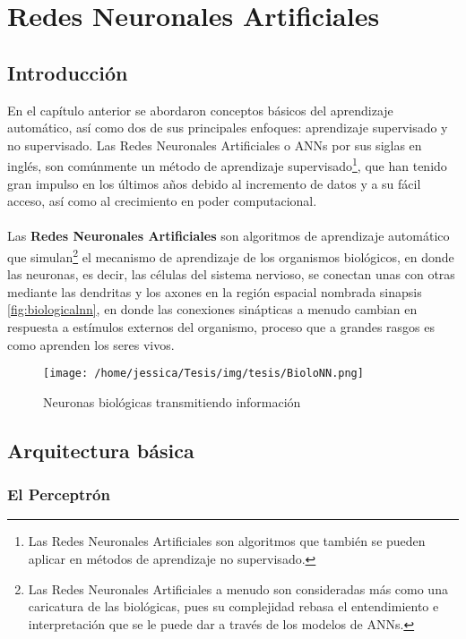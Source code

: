 \chapter{Redes Neuronales Artificiales}\label{ch:NNBasics}
\section{Introducción}

En el capítulo anterior se abordaron conceptos básicos del aprendizaje automático, así como dos de sus principales enfoques: aprendizaje supervisado y no supervisado. Las Redes Neuronales Artificiales o \acp{ANN} por sus siglas en inglés, son comúnmente un método de aprendizaje supervisado\footnote{Las Redes Neuronales Artificiales son algoritmos que también se pueden aplicar en métodos de aprendizaje no supervisado.}, que han tenido gran impulso en los últimos años debido al incremento de datos y a su fácil acceso, así como al crecimiento en poder computacional.
\\
\\
Las \textbf{Redes Neuronales Artificiales}  son algoritmos de aprendizaje automático que simulan\footnote{Las Redes Neuronales Artificiales a menudo son consideradas más como una caricatura de las biológicas, pues su complejidad rebasa el entendimiento e interpretación que se le puede dar a través de los modelos de \acp{ANN}.} el mecanismo de aprendizaje de los organismos biológicos, en donde las neuronas, es decir, las células del sistema nervioso, se conectan unas con otras mediante las dendritas y los axones en la región espacial nombrada sinapsis \autoref{fig:biologicalnn}, en donde las conexiones sinápticas a menudo cambian en respuesta a estímulos externos del organismo, proceso que a grandes rasgos es como aprenden los seres vivos. \cite{Nielsen:2018}

\begin{figure}[hb]
  \centering
  \texttt{[image: /home/jessica/Tesis/img/tesis/BioloNN.png]}
  \caption{Neuronas biológicas transmitiendo información \cite{Gardell:2010}}
  \label{fig:biologicalnn}
\end{figure}


\section{Arquitectura básica}

\subsection{El Perceptrón}\label{sec:perceptron}

